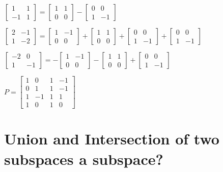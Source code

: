 \documentclass[12pt, letterpaper, twoside]{article}
\newcommand{\gap}{\vspace{2mm}}
\begin{document}
$\begin{bmatrix}
    1 & 1\\
    -1 & 1
\end{bmatrix} =
\begin{bmatrix}
    1 & 1\\
    0 & 0
\end{bmatrix} -
\begin{bmatrix}
    0 & 0\\
    1 & -1
\end{bmatrix}$

$\begin{bmatrix}
    2 & -1\\
    1 & -2
\end{bmatrix} =
\begin{bmatrix}
    1 & -1\\
    0 & 0
\end{bmatrix} + 
\begin{bmatrix}
    1 & 1\\
    0 & 0
\end{bmatrix} +
\begin{bmatrix}
    0 & 0\\
    1 & -1
\end{bmatrix} +
\begin{bmatrix}
    0 & 0\\
    1 & -1
\end{bmatrix}$

$\begin{bmatrix}
    -2 & 0\\
    1 & -1
\end{bmatrix} =
-\begin{bmatrix}
    1 & -1\\
    0 & 0
\end{bmatrix} -
\begin{bmatrix}
    1 & 1\\
    0 & 0
\end{bmatrix} +
\begin{bmatrix}
    0 & 0\\
    1 & -1
\end{bmatrix}$\gap

$P = 
\begin{bmatrix}
    1 & 0 & 1 & -1\\
    0 & 1 & 1 & -1\\
    1 & -1 & 1 & 1\\
    1 & 0 & 1 & 0
\end{bmatrix}$

\section{Union and Intersection of two subspaces a subspace?}\gap
\end{document}
